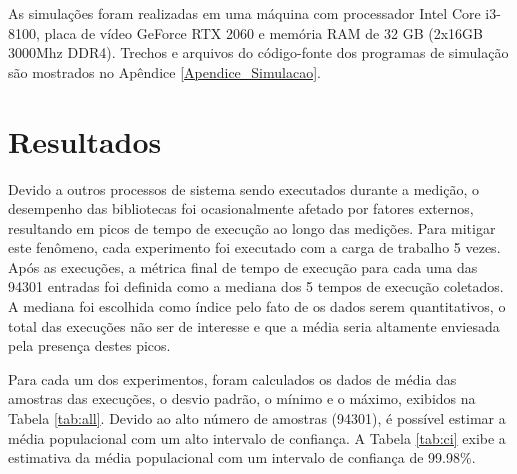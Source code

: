 As simulações foram realizadas em uma máquina com processador Intel Core i3-8100, placa de vídeo GeForce RTX 2060 e memória RAM de 32 GB (2x16GB 3000Mhz DDR4). Trechos e arquivos do código-fonte dos programas de simulação são mostrados no Apêndice \ref{Apendice_Simulacao}.

\section{Resultados}

Devido a outros processos de sistema sendo executados durante a medição, o desempenho das bibliotecas foi ocasionalmente afetado por fatores externos, resultando em picos de tempo de execução ao longo das medições. Para mitigar este fenômeno, cada experimento foi executado com a carga de trabalho 5 vezes. Após as execuções, a métrica final de tempo de execução para cada uma das 94301 entradas foi definida como a mediana dos 5 tempos de execução coletados. A mediana foi escolhida como índice pelo fato de os dados serem quantitativos, o total das execuções não ser de interesse e que a média seria altamente enviesada pela presença destes picos.

Para cada um dos experimentos, foram calculados os dados de média das amostras das execuções, o desvio padrão, o mínimo e o máximo, exibidos na Tabela \ref{tab:all}. Devido ao alto número de amostras (94301), é possível estimar a média populacional com um alto intervalo de confiança. A Tabela \ref{tab:ci} exibe a estimativa da média populacional com um intervalo de confiança de 99.98\%.

